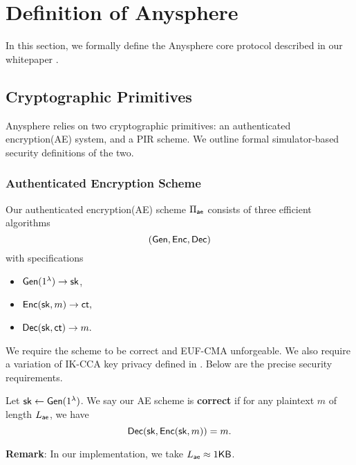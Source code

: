 \section{Definition of Anysphere}
\label{sec:asphr-defn}
In this section, we formally define the Anysphere core protocol described in our whitepaper \cite{whitepaper}. 
\subsection{Cryptographic Primitives}
Anysphere relies on two cryptographic primitives: an authenticated encryption(AE) system, and a PIR scheme. We outline formal simulator-based security definitions of the two. 

\subsubsection{Authenticated Encryption Scheme}
\label{subsec:AE}
Our authenticated encryption(AE) scheme $\Pi_{\mathsf{ae}}$ consists of three efficient algorithms 
$$(\mathsf{Gen}, \mathsf{Enc}, \mathsf{Dec})$$
with specifications
\begin{itemize}
    \item $\mathsf{Gen}(1^{\lambda}) \to {\ensuremath{\mathsf{sk}}}$,
    \item $\mathsf{Enc}({\mathsf{sk}}, m) \to \mathsf{ct},$
    \item $\mathsf{Dec}({\mathsf{sk}}, \mathsf{ct}) \to m.$
\end{itemize}
We require the scheme to be correct and EUF-CMA unforgeable. We also require a variation of IK-CCA key privacy defined in \cite{BBDP01keyprivate}. Below are the precise security requirements.

\begin{definition}
\label{defn:AE-correctness}
Let ${\mathsf{sk}} \leftarrow \mathsf{Gen}(1^{\lambda})$. We say our AE scheme is \textbf{correct} if for any plaintext $m$ of length $L_{\mathsf{ae}}$, we have
$$\mathsf{Dec}({\mathsf{sk}}, \mathsf{Enc}({\mathsf{sk}}, m)) = m.$$
\end{definition}
\textbf{Remark}: In our implementation, we take $L_{\mathsf{ae}} \approx 1 \mathsf{KB}$.

